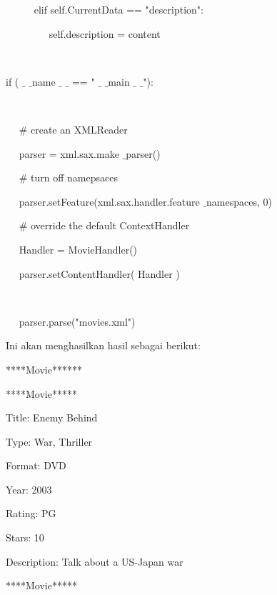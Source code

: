 \documentclass{wileySix}
\begin{document}
\begin{myEnumerate}
	\noindent 
	~~~~~ elif self.CurrentData == "description": \par
	\noindent 
	~~~~~~~~ self.description = content \par
	\noindent 
	~  \par
	\noindent 
	if (  $  \_  $ $  \_  $name $  \_  $ $  \_  $ == " $  \_  $ $  \_  $main $  \_  $ $  \_  $"): \par
	\noindent 
	~~  \par
	\noindent 
	~~  $  \#  $ create an XMLReader \par
	\noindent 
	~~ parser = xml.sax.make $  \_  $parser() \par
	\noindent 
	~~  $  \#  $ turn off namepsaces \par
	\noindent 
	~~ parser.setFeature(xml.sax.handler.feature $  \_  $namespaces, 0) \par
	\vspace{12pt}
	\noindent 
	~~  $  \#  $ override the default ContextHandler \par
	\noindent 
	~~ Handler = MovieHandler() \par
	\noindent 
	~~ parser.setContentHandler( Handler ) \par
	\noindent 
	~~  \par
	\noindent 
	~~ parser.parse("movies.xml") \par
	\vspace{12pt}
	\vspace{12pt}
	\noindent 
	Ini akan menghasilkan hasil sebagai berikut: \par
	\noindent 
	{\fontsize{10pt}{10pt}\selectfont *****Movie******} \par
	\noindent 
	{\fontsize{10pt}{10pt}\selectfont *****Movie*****} \par
	\noindent 
	{\fontsize{10pt}{10pt}\selectfont Title: Enemy Behind} \par
	\noindent 
	{\fontsize{10pt}{10pt}\selectfont Type: War, Thriller} \par
	\noindent 
	{\fontsize{10pt}{10pt}\selectfont Format: DVD} \par
	\noindent 
	{\fontsize{10pt}{10pt}\selectfont Year: 2003} \par
	\noindent 
	{\fontsize{10pt}{10pt}\selectfont Rating: PG} \par
	\noindent 
	{\fontsize{10pt}{10pt}\selectfont Stars: 10} \par
	\noindent 
	{\fontsize{10pt}{10pt}\selectfont Description: Talk about a US-Japan war} \par
	\noindent 
	{\fontsize{10pt}{10pt}\selectfont *****Movie*****} \par

\end{myEnumerate}
\end{document}
